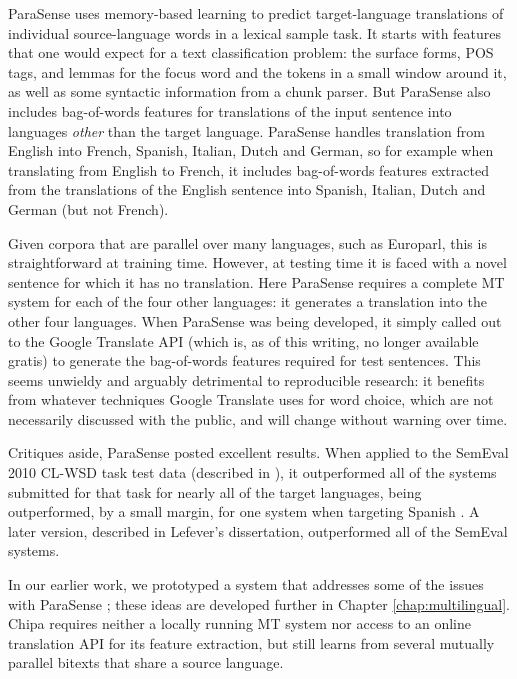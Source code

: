ParaSense uses memory-based learning to predict target-language translations of
individual source-language words in a lexical sample task. It starts with
features that one would expect for a text classification problem: the surface
forms, POS tags, and lemmas for the focus word and the tokens in a small window
around it, as well as some syntactic information from a chunk parser. But
ParaSense also includes bag-of-words features for translations of the input
sentence into languages \emph{other} than the target language. ParaSense
handles translation from English into French, Spanish, Italian, Dutch and
German, so for example when translating from English to French, it includes
bag-of-words features extracted from the translations of the English sentence
into Spanish, Italian, Dutch and German (but not French).

Given corpora that are parallel over many languages, such as Europarl, this is
straightforward at training time. However, at testing time it is faced with a
novel sentence for which it has no translation. Here ParaSense requires a
complete MT system for each of the four other languages: it generates a
translation into the other four languages.
When ParaSense was being developed, it simply called out to the Google
Translate API (which is, as of this writing, no longer available gratis) to
generate the bag-of-words features required for test sentences.
This seems unwieldy and arguably detrimental to reproducible research: it
benefits from whatever techniques Google Translate uses for word choice,
which are not necessarily discussed with the public, and will change
without warning over time.

Critiques aside, ParaSense posted excellent results. When applied to the
SemEval 2010 CL-WSD task test data (described in
\cite{lefever-hoste:2010:SemEval}), it outperformed all of the systems
submitted for that task for nearly all of the target languages, being
outperformed, by a small margin, for one system when targeting Spanish
\cite{lefever-hoste-decock:2011:ACL-HLT2011}. A later version, described in
Lefever's dissertation, outperformed all of the SemEval systems.

In our earlier work, we prototyped a system that addresses some of the issues
with ParaSense \cite{rudnick-liu-gasser:2013:SemEval-2013}; these ideas are
developed further in Chapter \ref{chap:multilingual}.
Chipa requires neither a locally running MT system nor access to an online
translation API for its feature extraction, but still learns from several
mutually parallel bitexts that share a source language.


